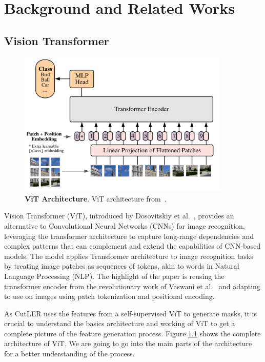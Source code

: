 \chapter{Background and Related Works}\label{chap:background}

\section{Vision Transformer}

\begin{figure}
	\centering
	\includegraphics[width=0.9\textwidth]{Images/main/vit_full_arch.png}
	\caption[\textbf{ViT Architecture}]{\textbf{ViT Architecture}. ViT architecture from~\cite{dosovitskiy2020image}.}
	\label{fig:vit_full_arch}
\end{figure}

Vision Transformer (ViT), introduced by Dosovitskiy et al.~\cite{dosovitskiy2020image}, provides an alternative to Convolutional Neural Networks (CNNs) for image recognition, leveraging the transformer architecture to capture long-range dependencies and complex patterns that can complement and extend the capabilities of CNN-based models. The model applies Transformer architecture to image recognition tasks by treating image patches as sequences of tokens, akin to words in Natural Language Processing (NLP). The highlight of the paper is reusing the transformer encoder from the revolutionary work of Vaswani et al.~\cite{vaswani2023attentionneed} and adapting to use on images using patch tokenization and positional encoding.

As CutLER uses the features from a self-supervised ViT to generate masks, it is crucial to understand the basics architecture and working of ViT to get a complete picture of the feature generation process. Figure \ref{fig:vit_full_arch} shows the complete architecture of ViT. We are going to go into the main parts of the architecture for a better understanding of the process.

